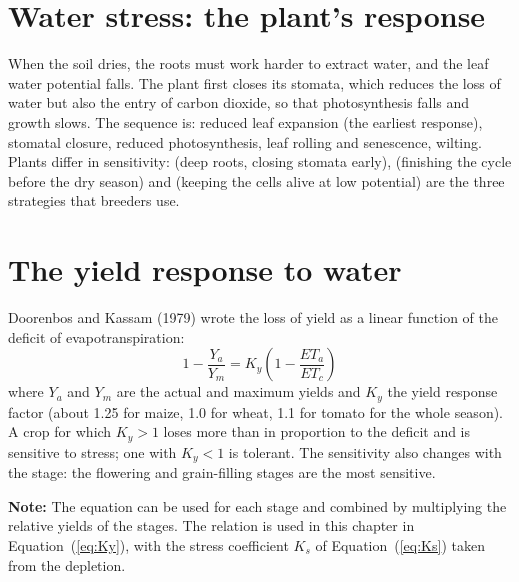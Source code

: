 \section{Water stress: the plant's response}
When the soil dries, the roots must work harder to extract water, and the leaf water potential falls. The plant first closes its stomata, which reduces the loss of water but also the entry of carbon dioxide, so that photosynthesis falls and growth slows. The sequence is: reduced leaf expansion (the earliest response), stomatal closure, reduced photosynthesis, leaf rolling and senescence, wilting. Plants differ in sensitivity:  (deep roots, closing stomata early),  (finishing the cycle before the dry season) and  (keeping the cells alive at low potential) are the three strategies that breeders use.

\section{The yield response to water}
Doorenbos and Kassam (1979) wrote the loss of yield as a linear function of the deficit of evapotranspiration:
\begin{equation*}\boxed{1-\frac{Y_a}{Y_m}=K_y\left(1-\frac{ET_a}{ET_c}\right)}\end{equation*}
where $Y_a$ and $Y_m$ are the actual and maximum yields and $K_y$ the yield response factor (about 1.25 for maize, 1.0 for wheat, 1.1 for tomato for the whole season). A crop for which $K_y>1$ loses more than in proportion to the deficit and is sensitive to stress; one with $K_y<1$ is tolerant. The sensitivity also changes with the stage: the flowering and grain-filling stages are the most sensitive.
\par\noindent \textbf{Note:} The equation can be used for each stage and combined by multiplying the relative yields of the stages. The relation is used in this chapter in Equation~(\ref{eq:Ky}), with the stress coefficient $K_s$ of Equation~(\ref{eq:Ks}) taken from the depletion.
